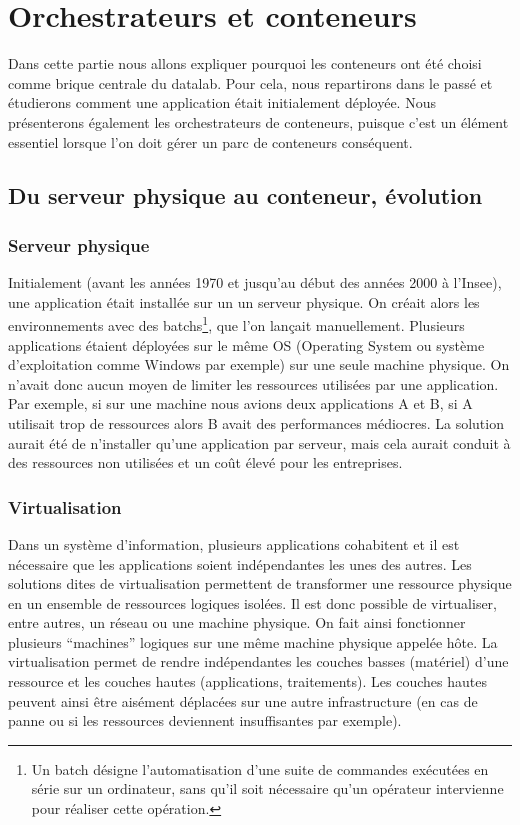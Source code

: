 \documentclass[11pt,fleqn]{book} %
\begin{document}
\chapter{Orchestrateurs et conteneurs}
\vspace{-2cm}

Dans cette partie nous allons expliquer pourquoi les conteneurs ont été choisi comme brique centrale du datalab. Pour cela, nous repartirons dans le passé et étudierons comment une application était initialement déployée. Nous présenterons également les orchestrateurs de conteneurs, puisque c'est un élément essentiel lorsque l'on doit gérer un parc de conteneurs conséquent.

\section{Du serveur physique au conteneur, évolution}
\subsection{Serveur physique}
Initialement (avant les années 1970 et jusqu'au début des années 2000 à l'Insee), une application était installée sur un un serveur physique. On créait alors les environnements avec des batchs\footnote{Un batch désigne l'automatisation d'une suite de commandes exécutées en série sur un ordinateur, sans qu'il soit nécessaire qu'un opérateur intervienne pour réaliser cette opération.}, que l'on lançait manuellement. Plusieurs applications étaient déployées sur le même OS (Operating System ou système d'exploitation comme Windows par exemple) sur une seule machine physique. On n'avait donc aucun moyen de limiter les ressources utilisées par une application. Par exemple, si sur une machine nous avions deux applications A et B, si A utilisait trop de ressources alors B avait des performances médiocres. La solution aurait été de n'installer qu'une application par serveur, mais cela aurait conduit à des ressources non utilisées et un coût élevé pour les entreprises. \newline


\newline

\subsection{Virtualisation}
Dans un système d'information, plusieurs applications cohabitent et il est nécessaire que les applications soient indépendantes les unes des autres. Les solutions dites de virtualisation permettent de transformer une ressource physique en un ensemble de ressources logiques isolées. Il est donc possible de virtualiser, entre autres, un réseau ou une machine physique. On fait ainsi fonctionner plusieurs “machines” logiques sur une même machine physique appelée hôte. La virtualisation permet de rendre indépendantes les couches basses (matériel) d’une ressource et les couches hautes (applications, traitements). Les couches hautes peuvent ainsi être aisément déplacées sur une autre infrastructure (en cas de panne ou si les ressources deviennent insuffisantes par exemple).
\end{document}
